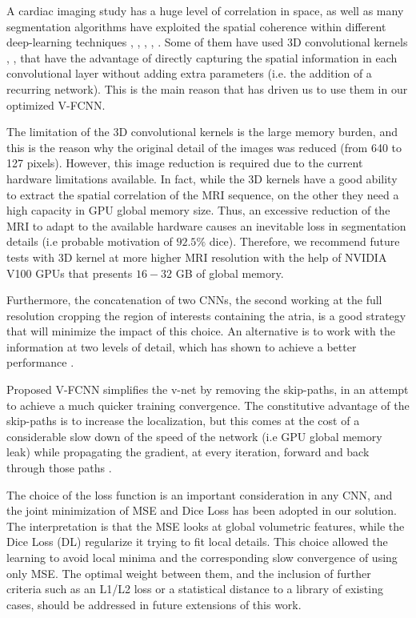 \documentclass{llncs}
\begin{document}
A cardiac imaging study has a huge level of correlation in space, as well as many segmentation algorithms have exploited the spatial coherence within different deep-learning techniques \cite{Fausto}, \cite{Isensee}, \cite{Hinrich}, \cite{Poudel}, \cite{Jianxu}. Some of them have used 3D convolutional kernels \cite{Fausto}, \cite{Isensee}, \cite{Hinrich} that have the advantage of directly capturing the spatial information in each convolutional layer without adding extra parameters (i.e. the addition of a recurring network). This is the main reason that has driven us to use them in our optimized V-FCNN. 

The limitation of the 3D convolutional kernels is the large memory burden, and this is the reason why the original detail of the images was reduced (from 640 to 127 pixels). 
However, this image reduction is required due to the current hardware limitations available. In fact, while the 3D kernels have a good ability to extract the spatial correlation of the MRI sequence, on the other they need a high capacity in GPU global memory size.
Thus, an excessive reduction of the MRI to adapt to the available hardware causes an inevitable
loss in segmentation details (i.e probable motivation of $92.5 \%$ dice). 
Therefore, we recommend future tests with 3D kernel at more higher MRI resolution with the help
of NVIDIA V100 GPUs \cite{ZheJia} that presents $16-32$ GB of global memory.

Furthermore, the concatenation of two CNNs, the second working at the full resolution cropping the region of interests containing the atria, is a good strategy that will minimize the impact of this choice. An alternative is to work with the information at two levels of detail, which has shown to achieve a better performance \cite{Zhaohan}.

Proposed V-FCNN simplifies the v-net \cite{Fausto} by removing the skip-paths, in an attempt to achieve a much quicker training convergence. The constitutive advantage of the skip-paths is to increase the localization, but this comes at the cost of a considerable slow down of the speed of the network (i.e GPU global memory leak) while propagating the gradient, at every iteration, forward and back through those paths \cite{AdamPaszke}. 

The choice of the loss function is an important consideration in any CNN, and the joint minimization of MSE and Dice Loss has been adopted in our solution. The interpretation is that the MSE looks at global volumetric features, while the Dice Loss (DL) regularize it trying to fit local details. This choice allowed the learning to avoid local minima and the corresponding slow convergence of using only MSE. The optimal weight between them, and the inclusion of further criteria such as an L1/L2 loss or a statistical distance to a library of existing cases, should be addressed in future extensions of this work. 
\end{document}
